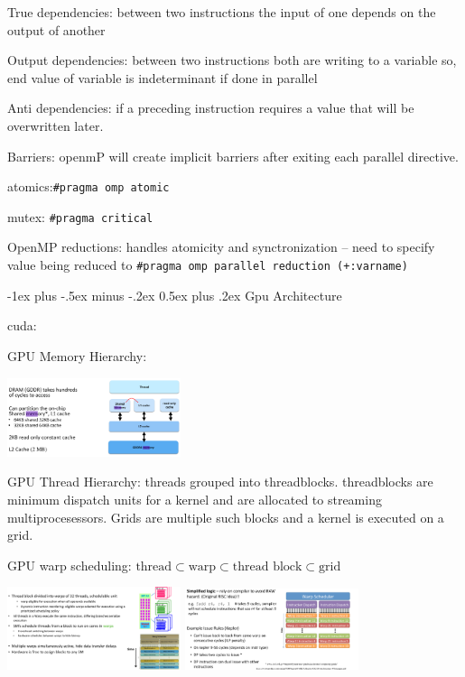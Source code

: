 \documentclass[letter,8pt,landscape]{article}
\makeatletter
\renewcommand{\section}{\@startsection{section}{1}{0mm}%
                                {-1ex plus -.5ex minus -.2ex}%
                                {0.5ex plus .2ex}%
                                {\normalfont\large\bfseries}}
\makeatother
\begin{document}
\begin{multicols}{3}
  True dependencies: between two instructions the input of one depends on the
  output of another

  Output dependencies: between two instructions both are writing to a variable
  so, end value of variable is indeterminant if done in parallel

  Anti dependencies: if a preceding instruction requires a value that will be
  overwritten later. 

  Barriers: openmP will create implicit barriers after exiting each parallel
  directive.

  atomics:\verb|#pragma omp atomic| 

  mutex: \verb|#pragma critical|

  OpenMP reductions: handles atomicity and synctronization -- need to specify
  value being reduced to \verb|#pragma omp parallel reduction (+:varname)|

  \section{Gpu Architecture}

  cuda:

  GPU Memory Hierarchy:
  \begin{center}
    \includegraphics[width=2in]{images/gpu-mem.jpg}
  \end{center}

  GPU Thread Hierarchy: threads grouped into threadblocks. threadblocks are
  minimum dispatch units for a kernel and are allocated to streaming
  multiprocesessors. Grids are multiple such blocks and a kernel is executed on
  a grid. 

  GPU warp scheduling: $\text{thread} \subset \text{warp} \subset\text{thread block} \subset\text{grid}$

  \begin{center}
    \includegraphics[width=2in]{images/warp-scheduling.jpg}
    \includegraphics[width=2in]{images/warp-scheduling2.jpg}
  \end{center}


\end{multicols}
\end{document}
